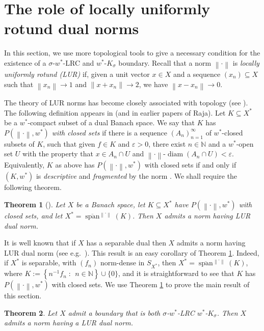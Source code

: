 \documentclass[12pt,reqno]{amsart}
\newcommand{\cl}[1]{\ensuremath{\overline{{#1}}}}
\newcommand{\diam}[1]{\ensuremath{\sdiam{\left({#1}\right)}}}
\newcommand{\ep}{\varepsilon}
\newcommand{\n}[1]{\ensuremath{\left\|{#1}\right\|}}
\newcommand{\N}{\mathbb{N}}
\newcommand{\ndot}{\ensuremath{\left\|\cdot\right\|}}
\newcommand{\set}[2]{\ensuremath{\left\{{#1}\;:\;\,{#2}\right\}}}
\DeclareMathOperator{\aspan}{span}
\DeclareMathOperator{\sdiam}{diam}
\newtheorem{thm}{Theorem}[section]
\theoremstyle{definition}
\begin{document}
\section{The role of locally uniformly rotund dual norms}\label{sect_LUR}

In this section, we use more topological tools to give a necessary condition for the existence of a $\sigma$-$w^*$-LRC and $w^*$-$K_\sigma$ boundary. Recall that a norm $\ndot$ is {\em locally uniformly rotund (LUR)} if, given a unit vector $x \in X$ and a sequence $(x_n) \subseteq X$ such that $\n{x_n} \to 1$ and $\n{x+x_n}\to 2$, we have $\n{x-x_n}\to 0$.

The theory of LUR norms has become closely associated with topology (see \cite{motv:09}). The following definition appears in \cite{or:04,raja:02} (and in earlier papers of Raja). Let $K \subseteq X^*$ be a $w^*$-compact subset of a dual Banach space. We say that $K$ has \emph{$P(\ndot,w^*)$ with closed sets} if there is a sequence $(A_n)_{n=1}^\infty$ of $w^*$-closed subsets of $K$, such that given $f \in K$ and $\ep>0$, there exist $n\in\N$ and a $w^*$-open set $U$ with the property that $x \in A_n \cap U$ and $\ndot$-$\diam{A_n \cap U}<\ep$. Equivalently, $K$ as above has $P(\ndot,w^*)$ with closed sets if and only if $(K,w^*)$ is \emph{descriptive} and \emph{fragmented} by the norm \cite{or:04}. We shall require the following theorem.

\begin{thm}[{\cite[Theorems 1.3, 2.2 and 2.5]{or:04}}]\label{or_thm}
Let $X$ be a Banach space, let $K \subseteq X^*$ have $P(\ndot,w^*)$ with closed sets, and let $X^* = \cl{\aspan}^{\ndot}(K)$. Then $X$ admits a norm having LUR dual norm.
\end{thm}

It is well known that if $X$ has a separable dual then $X$ admits a norm having LUR dual norm (see e.g.~\cite[Theorem II.2.6]{dgz:93}). This result is an easy corollary of Theorem \ref{or_thm}. Indeed, if $X^*$ is separable, with $(f_n)$ norm-dense in $S_{X^*}$, then $X^*=\cl{\aspan}^{\ndot}(K)$, where $K:=\set{n^{-1}f_n}{n \in \N} \cup \{0\}$, and it is straightforward to see that $K$ has $P(\ndot,w^*)$ with closed sets. We use Theorem \ref{or_thm} to prove the main result of this section.

\begin{thm}\label{main}
Let $X$ admit a boundary that is both $\sigma$-$w^*$-LRC $w^*$-$K_\sigma$. Then $X$ admits a norm having a LUR dual norm. 
\end{thm}
\end{document}
